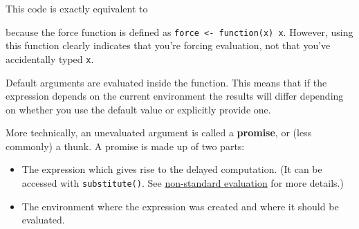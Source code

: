 This code is exactly equivalent to

\begin{Shaded}
\begin{Highlighting}[]
\StringTok{ }
  \StringTok{ }
\NormalTok{\}}
\end{Highlighting}
\end{Shaded}

because the force function is defined as
\texttt{force \textless{}- function(x) x}. However, using this function
clearly indicates that you're forcing evaluation, not that you've
accidentally typed \texttt{x}.

Default arguments are evaluated inside the function. This means that if
the expression depends on the current environment the results will
differ depending on whether you use the default value or explicitly
provide one.

\begin{Shaded}
\begin{Highlighting}[]
\StringTok{ } \NormalTok{()) \{}
  \StringTok{ }
\NormalTok{\}}

\NormalTok{()}

\NormalTok{(}\NormalTok{())}
\end{Highlighting}
\end{Shaded}

More technically, an unevaluated argument is called a \textbf{promise},
or (less commonly) a thunk. A promise is made up of two parts:
 

\begin{itemize}
\item
  The expression which gives rise to the delayed computation. (It can be
  accessed with \texttt{substitute()}. See \hyperref[nse]{non-standard
  evaluation} for more details.)
\item
  The environment where the expression was created and where it should
  be evaluated.
\end{itemize}

